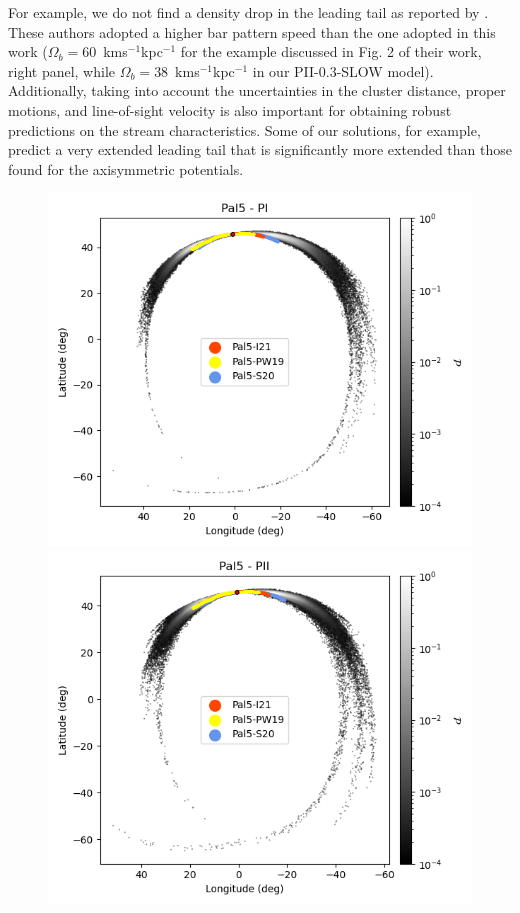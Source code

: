 For example, we do not find a density drop in the leading tail as reported by  \citet{2017NatAs...1..633P}. These authors adopted a higher bar pattern speed than the one adopted in this work ($\Omega_b=60$~kms$^{-1}$kpc$^{-1}$ for the example discussed in Fig. 2 of their work, right panel, while $\Omega_b=38$~kms$^{-1}$kpc$^{-1}$ in our PII-0.3-SLOW model). Additionally, taking into account the uncertainties in the cluster distance, proper motions, and line-of-sight velocity is also important for obtaining robust predictions on the stream characteristics. Some of our solutions, for example, predict a very extended leading tail that is significantly more extended than those found for the axisymmetric potentials.

            \twocolumn
            \begin{figure}[h!]
                \begin{center}
                    \includegraphics[clip=true, trim = 0mm 0mm 0mm 0mm, width=0.65\columnwidth]{images/PI_individual_Pal5_galstream-Pal5-l-b.png}
                    \includegraphics[clip=true, trim = 0mm 0mm 0mm 0mm, width=0.65\columnwidth]{images/PII_individual_Pal5_galstream-Pal5-l-b.png}

\end{center}
\end{figure}

